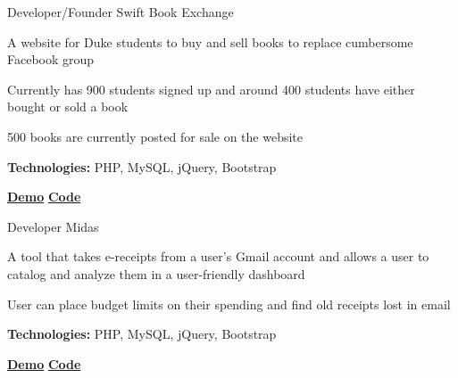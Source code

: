 
\begin{cventries}

  \cventry
    {Developer/Founder} %
    {Swift Book Exchange} %
    {} %
    {} %
    {
      \begin{cvitems} %
      	\item {A website for Duke students to buy and sell books to replace cumbersome Facebook group}
		\item {Currently has 900 students signed up and around 400 students have either bought or sold a book}
		\item {500 books are currently posted for sale on the website}
		{\setlength \itemindent{-2ex} \itemsep2pt \item[] \textbf{Technologies:} PHP, MySQL, jQuery, Bootstrap}
		{\setlength \itemindent{-2ex} \itemsep2pt \item[]  \href{www.google.com}{ \faTelevision \textbf{ Demo}} \href{https://github.com/sujaygarlanka/swift-book-exchange}{ \faCodeFork \textbf{ Code}}}
      \end{cvitems}
    }
    
  \cventry
    {Developer} %
    {Midas} %
    {} %
    {} %
    {
      \begin{cvitems} %
		\item {A tool that takes e-receipts from a user’s Gmail account and allows a user to catalog and
analyze them in a user-friendly dashboard}
        \item {User can place budget limits on their spending and find old receipts lost in email}
        {\setlength \itemindent{-2ex} \itemsep2pt \item[] \textbf{Technologies:} PHP, MySQL, jQuery, Bootstrap}
        {\setlength \itemindent{-2ex} \itemsep2pt \item[]  \href{www.google.com}{ \faTelevision \textbf{ Demo}} \href{https://github.com/sujaygarlanka/receipt-database}{ \faCodeFork \textbf{ Code}}}
      \end{cvitems}
    }
\end{cventries}